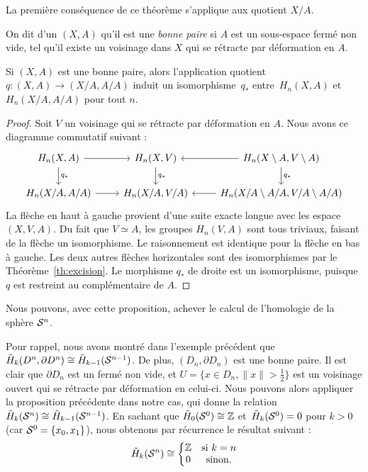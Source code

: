 La première conséquence de ce théorème s'applique aux quotient $X/A$.

On dit d'un $(X,A)$ qu'il est une \emph{bonne paire} si $A$ est un sous-espace fermé non vide, tel qu'il existe un voisinage dans $X$ qui se rétracte par déformation en $A$.

\begin{proposition}
Si $(X,A)$ est une bonne paire, alors l'application quotient $q:(X,A)\to (X/A,A/A)$ induit un isomorphisme~$q_\ast$ entre~$H_n(X,A)$ et~$H_n(X/A,A/A)$ pour tout $n$.
\end{proposition}

\begin{proof}
Soit $V$ un voisinage qui se rétracte par déformation en $A$. Nous avons ce diagramme commutatif suivant : \[\begin{tikzcd}
H_n(X,A)\arrow[d,"q_\ast"]\arrow[r]&H_n(X,V)\arrow[d,"q_\ast"]&H_n(X\setminus A,V\setminus A)\arrow[d,"q_\ast"]\arrow[l]\\
H_n(X/A,A/A)\arrow[r]&H_n(X/A,V/A)&H_n(X/A\setminus A/A,V/A\setminus A/A)\arrow[l]
\end{tikzcd}\] La flèche en haut à gauche provient d'une suite exacte longue avec les espace $(X,V,A)$. Du fait que $V\simeq A$, les groupes $H_n(V,A)$ sont tous triviaux, faisant de la flèche un isomorphisme. Le raisonnement est identique pour la flèche en bas à gauche. Les deux autres flèches horizontales sont des isomorphismes par le Théorème~\ref{th:excision}. Le morphisme $q_\ast$ de droite est un isomorphisme, puisque $q$ est restreint au complémentaire de $A$.
\end{proof}

Nous pouvons, avec cette proposition, achever le calcul de l'homologie de la sphère $\mathcal{S}^{n}$.

\begin{exemple}
Pour rappel, nous avons montré dans l'exemple précédent que~${\Tilde{H}_k(D^n,\partial D^n)\cong \Tilde{H}_{k-1}(\mathcal{S}^{n-1})}$.
De plus, $(D_n,\partial D_n)$ est une bonne paire. Il est clair que $\partial D_n$ est un fermé non vide, et $U=\{x\in D_n, \|x\|>\frac{1}{2}\}$ est un voisinage ouvert qui se rétracte par déformation en celui-ci. Nous pouvons alors appliquer la proposition précédente dans notre cas, qui donne la relation $\Tilde{H}_k(\mathcal{S}^{n})\cong \Tilde{H}_{k-1}(\mathcal{S}^{n-1})$. En sachant que $\Tilde{H}_0(\mathcal{S}^{0})\cong\mathbb{Z}$ et~$\Tilde{H}_k(\mathcal{S}^{0})=0$ pour $k>0$ (car $\mathcal{S}^{0}=\{x_0,x_1\}$), nous obtenons par récurrence le résultat suivant : \[ \Tilde{H}_k(\mathcal{S}^{n})\cong\left\{\begin{matrix}
\mathbb{Z}&\text{si}\ k=n\\
0&\text{sinon}.
\end{matrix}\right.\]
\end{exemple}


